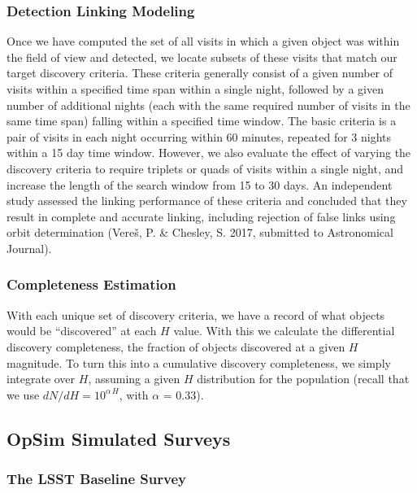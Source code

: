 \subsubsection{Detection Linking Modeling}

Once we have computed the set of all visits in which a given object was within the field of view and detected, we locate subsets of these visits that match our target discovery criteria. These criteria generally consist of a given number of visits within a specified
time span within a single night, followed by a given number of additional nights (each with the same required number
of visits in the same time span) falling within a specified time window. The basic criteria is a pair of visits in each
night occurring within 60 minutes, repeated for 3 nights within a 15 day time window. However, we also evaluate
the effect of varying the discovery criteria to require triplets or quads of visits within a single night, and increase
the length of the search window from 15 to 30 days. An independent study  assessed the linking performance of these 
criteria and concluded that they result in complete and accurate linking, including rejection of false links using orbit determination 
(Vere\v{s}, P. \& Chesley, S. 2017, submitted to Astronomical Journal).


\subsubsection{Completeness Estimation}

With each unique set of discovery criteria, we have a record of what objects would be ``discovered'' at each $H$ value.
With this we calculate the differential discovery completeness, the fraction of objects discovered at a given $H$ magnitude.
To turn this into a cumulative discovery completeness, we simply integrate over $H$, assuming a given $H$ distribution
for the population (recall that we use $dN/dH = 10^{\alpha\, H}$, with $\alpha$ = 0.33).


\subsection{OpSim Simulated Surveys \label{sec:surveys}}

\subsubsection{The LSST Baseline Survey}

